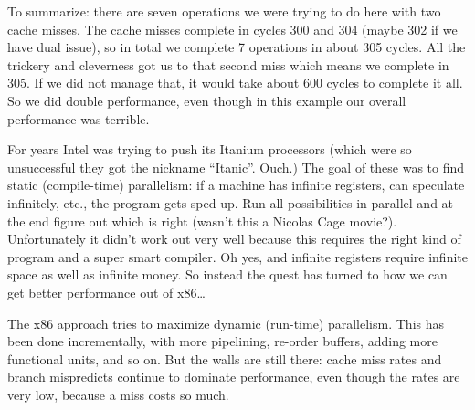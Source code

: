 
To summarize: there are seven operations we were trying to do here with two cache misses. The cache misses complete in cycles 300 and 304 (maybe 302 if we have dual issue), so in total we complete 7 operations in about 305 cycles. All the trickery and cleverness got us to that second miss which means we complete in 305. If we did not manage that, it would take about 600 cycles to complete it all. So we did double performance, even though in this example our overall performance was terrible.
 
For years Intel was trying to push its Itanium processors (which were so unsuccessful they got the nickname ``Itanic''. Ouch.) The goal of these was to find static (compile-time) parallelism: if a machine has infinite registers, can speculate infinitely, etc., the program gets sped up. Run all possibilities in parallel and at the end figure out which is right (wasn't this a Nicolas Cage movie?). Unfortunately it didn't work out very well because this requires the right kind of program and a super smart compiler. Oh yes, and infinite registers require infinite space as well as infinite money. So instead the quest has turned to how we can get better performance out of x86\ldots

The x86 approach tries to maximize dynamic (run-time) parallelism. This has been done incrementally, with more pipelining, re-order buffers, adding more functional units, and so on. But the walls are still there: cache miss rates and branch mispredicts continue to dominate performance, even though the rates are very low, because a miss costs so much. 

